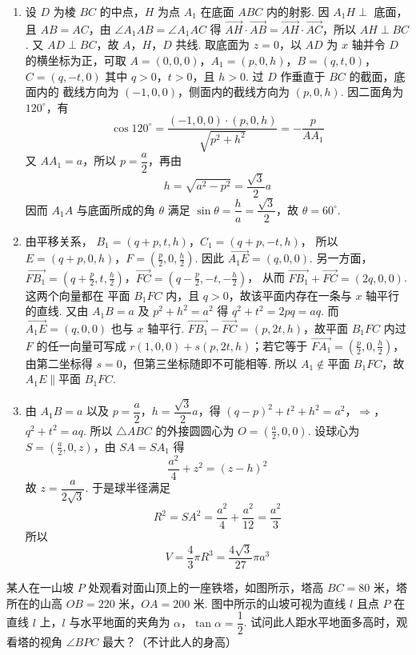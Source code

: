 \begin{solution}
\begin{enumerate}
\item 设 \(D\) 为棱 \(BC\) 的中点，\(H\) 为点 \(A_1\) 在底面 \(ABC\) 内的射影. 因
\(A_1H\perp\) 底面，且 \(AB=AC\)，由
\(\angle A_1AB=\angle A_1AC\) 得
\(\overrightarrow{AH}\cdot\overrightarrow{AB}=
\overrightarrow{AH}\cdot\overrightarrow{AC}\)，所以
\(AH\perp BC\). 又 \(AD\perp BC\)，故 \(A\)，\(H\)，\(D\) 共线. 取底面为
\(z=0\)，以 \(AD\) 为 \(x\) 轴并令 \(D\) 的横坐标为正，可取
\(A=(0,0,0)\)，\(A_1=(p,0,h)\)，\(B=(q,t,0)\)，\(C=(q,-t,0)\)
其中 \(q>0\)，\(t>0\)，且 \(h>0\). 过 \(D\) 作垂直于 \(BC\) 的截面，底面内的
截线方向为 \((-1,0,0)\)，侧面内的截线方向为 \((p,0,h)\). 因二面角为
\(120^\circ\)，有
\[
\cos120^\circ=\frac{(-1,0,0)\cdot(p,0,h)}{\sqrt{p^2+h^2}}=-\frac p{AA_1}
\]
又 \(AA_1=a\)，所以 \(p=\dfrac a2\)，再由
\[
h=\sqrt{a^2-p^2}=\frac{\sqrt3}{2}a
\]
因而 \(A_1A\) 与底面所成的角 \(\theta\) 满足
\(\sin\theta=\dfrac ha=\dfrac{\sqrt3}{2}\)，故 \(\theta=60^\circ\).
\item 由平移关系，
\(B_1=(q+p,t,h)\)，\(C_1=(q+p,-t,h)\)，
所以
\(E=(q+p,0,h)\)，\(F=\left(\frac p2,0,\frac h2\right)\).
因此 \(\overrightarrow{A_1E}=(q,0,0)\). 另一方面，
\(\overrightarrow{FB_1}=\left(q+\frac p2,t,\frac h2\right)\)，\(\overrightarrow{FC}=\left(q-\frac p2,-t,-\frac h2\right)\)，
从而 \(\overrightarrow{FB_1}+\overrightarrow{FC}=(2q,0,0)\). 这两个向量都在
平面 \(B_1FC\) 内，且 \(q>0\)，故该平面内存在一条与 \(x\) 轴平行的直线.
又由 \(A_1B=a\) 及 \(p^2+h^2=a^2\) 得
\(q^2+t^2=2pq=aq\). 而 \(\overrightarrow{A_1E}=(q,0,0)\) 也与 \(x\) 轴平行.
\(\overrightarrow{FB_1}-\overrightarrow{FC}=(p,2t,h)\)，故平面 \(B_1FC\) 内过 \(F\) 的任一向量可写成
\(r(1,0,0)+s(p,2t,h)\)；若它等于
\(\overrightarrow{FA_1}=(\frac{p}{2},0,\frac{h}{2})\)，由第二坐标得 \(s=0\)，但第三坐标随即不可能相等.
所以 \(A_1\notin\text{平面 }B_1FC\)，故 \(A_1E\parallel\text{平面 }B_1FC\).
\item 由 \(A_1B=a\) 以及 \(p=\dfrac a2\)，\(h=\dfrac{\sqrt3}2a\)，得
\((q-p)^2+t^2+h^2=a^2\)，\(\Longrightarrow\)，\(q^2+t^2=aq\).
所以 \(\triangle ABC\) 的外接圆圆心为 \(O=(\frac a2,0,0)\). 设球心为
\(S=(\frac a2,0,z)\)，由 \(SA=SA_1\) 得
\[
\frac{a^2}{4}+z^2=(z-h)^2
\]
故 \(z=\dfrac a{2\sqrt3}\). 于是球半径满足
\[
R^2=SA^2=\frac{a^2}{4}+\frac{a^2}{12}=\frac{a^2}{3}
\]
所以
\[
V=\frac43\pi R^3=\frac{4\sqrt3}{27}\pi a^3
\]
\end{enumerate}
\end{solution}

\begin{problem}
某人在一山坡 \(P\) 处观看对面山顶上的一座铁塔，如图所示，塔高
\(BC=80\text{ 米}\)，塔所在的山高 \(OB=220\text{ 米}\)，\(OA=200\text{ 米}\).
图中所示的山坡可视为直线 \(l\) 且点 \(P\) 在直线 \(l\) 上，\(l\) 与水平地面的夹角为
\(\alpha\)，\(\tan\alpha=\dfrac12\). 试问此人距水平地面多高时，观看塔的视角
\(\angle BPC\) 最大？（不计此人的身高）

\end{problem}

